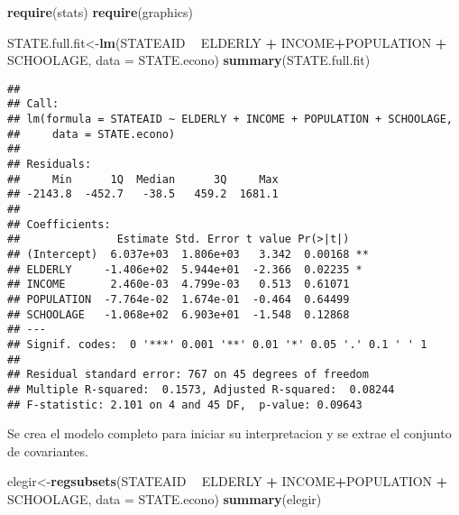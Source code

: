 \documentclass[
]{article}
\newenvironment{Shaded}{\begin{snugshade}}{\end{snugshade}}
\newcommand{\DataTypeTok}[1]{\textcolor[rgb]{0.13,0.29,0.53}{#1}}
\newcommand{\KeywordTok}[1]{\textcolor[rgb]{0.13,0.29,0.53}{\textbf{#1}}}
\newcommand{\NormalTok}[1]{#1}
\newcommand{\OperatorTok}[1]{\textcolor[rgb]{0.81,0.36,0.00}{\textbf{#1}}}
\newcommand{\StringTok}[1]{\textcolor[rgb]{0.31,0.60,0.02}{#1}}
\begin{document}
\begin{Shaded}
\begin{Highlighting}[]
\KeywordTok{require}\NormalTok{(stats)}
\KeywordTok{require}\NormalTok{(graphics)}
\end{Highlighting}
\end{Shaded}

\begin{Shaded}
\begin{Highlighting}[]
\NormalTok{STATE.full.fit<-}\KeywordTok{lm}\NormalTok{(STATEAID }\OperatorTok{~}\StringTok{ }\NormalTok{ELDERLY }\OperatorTok{+}\StringTok{ }\NormalTok{INCOME}\OperatorTok{+}\NormalTok{POPULATION }\OperatorTok{+}\StringTok{ }\NormalTok{SCHOOLAGE, }\DataTypeTok{data =}\NormalTok{ STATE.econo)}
\KeywordTok{summary}\NormalTok{(STATE.full.fit)}
\end{Highlighting}
\end{Shaded}

\begin{verbatim}
## 
## Call:
## lm(formula = STATEAID ~ ELDERLY + INCOME + POPULATION + SCHOOLAGE, 
##     data = STATE.econo)
## 
## Residuals:
##     Min      1Q  Median      3Q     Max 
## -2143.8  -452.7   -38.5   459.2  1681.1 
## 
## Coefficients:
##               Estimate Std. Error t value Pr(>|t|)   
## (Intercept)  6.037e+03  1.806e+03   3.342  0.00168 **
## ELDERLY     -1.406e+02  5.944e+01  -2.366  0.02235 * 
## INCOME       2.460e-03  4.799e-03   0.513  0.61071   
## POPULATION  -7.764e-02  1.674e-01  -0.464  0.64499   
## SCHOOLAGE   -1.068e+02  6.903e+01  -1.548  0.12868   
## ---
## Signif. codes:  0 '***' 0.001 '**' 0.01 '*' 0.05 '.' 0.1 ' ' 1
## 
## Residual standard error: 767 on 45 degrees of freedom
## Multiple R-squared:  0.1573, Adjusted R-squared:  0.08244 
## F-statistic: 2.101 on 4 and 45 DF,  p-value: 0.09643
\end{verbatim}

Se crea el modelo completo para iniciar su interpretacion y se extrae el
conjunto de covariantes.

\begin{Shaded}
\begin{Highlighting}[]
\NormalTok{elegir<-}\KeywordTok{regsubsets}\NormalTok{(STATEAID }\OperatorTok{~}\StringTok{ }\NormalTok{ELDERLY }\OperatorTok{+}\StringTok{ }\NormalTok{INCOME}\OperatorTok{+}\NormalTok{POPULATION }\OperatorTok{+}\StringTok{ }\NormalTok{SCHOOLAGE, }\DataTypeTok{data =}\NormalTok{ STATE.econo)}
\KeywordTok{summary}\NormalTok{(elegir)}
\end{Highlighting}
\end{Shaded}
\end{document}
